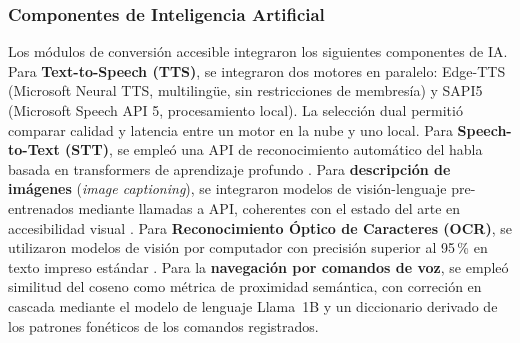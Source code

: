 \documentclass[journal]{IEEEtran}
\begin{document}
	\subsubsection{Componentes de Inteligencia Artificial}
	Los m\'odulos de conversi\'on accesible integraron los siguientes componentes de IA. Para \textbf{Text-to-Speech (TTS)}, se integraron dos motores en paralelo: Edge-TTS (Microsoft Neural TTS, multiling\"ue, sin restricciones de membres\'ia) y SAPI5 (Microsoft Speech API 5, procesamiento local). La selecci\'on dual permiti\'o comparar calidad y latencia entre un motor en la nube y uno local. Para \textbf{Speech-to-Text (STT)}, se emple\'o una API de reconocimiento autom\'atico del habla basada en transformers de aprendizaje profundo \cite{baevski2020, radford2023}. Para \textbf{descripci\'on de im\'agenes} (\textit{image captioning}), se integraron modelos de visi\'on-lenguaje pre-entrenados mediante llamadas a API, coherentes con el estado del arte en accesibilidad visual \cite{dognin2021, safiya2024}. Para \textbf{Reconocimiento \'Optico de Caracteres (OCR)}, se utilizaron modelos de visi\'on por computador con precisi\'on superior al 95\,\% en texto impreso est\'andar \cite{mukherjee2023}. Para la \textbf{navegaci\'on por comandos de voz}, se emple\'o similitud del coseno \cite{lahitani2016} como m\'etrica de proximidad sem\'antica, con correci\'on en cascada mediante el modelo de lenguaje Llama~1B y un diccionario derivado de los patrones fon\'eticos de los comandos registrados.
	
\end{document}
